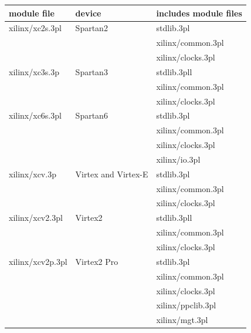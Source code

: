    \begin{tabular}{| l | l | l |}
    \hline
    module file      & device                          & includes module files  \\
    \hline \hline
    xilinx/xc2s.3pl  & Spartan2                        & stdlib.3pl \\
                     &                                 & xilinx/common.3pl \\
                     &                                 & xilinx/clocks.3pl \\ \hline
    xilinx/xc3s.3p   & Spartan3                        & stdlib.3pll \\
                     &                                 & xilinx/common.3pl \\
                     &                                 & xilinx/clocks.3pl \\ \hline
    xilinx/xc6s.3pl  & Spartan6                        & stdlib.3pl \\
                     &                                 & xilinx/common.3pl \\
                     &                                 & xilinx/clocks.3pl \\
                     &                                 & xilinx/io.3pl \\ \hline
    xilinx/xcv.3p    & Virtex and Virtex-E             & stdlib.3pl \\
                     &                                 & xilinx/common.3pl \\
                     &                                 & xilinx/clocks.3pl \\ \hline
    xilinx/xcv2.3pl  & Virtex2                         & stdlib.3pll \\
                     &                                 & xilinx/common.3pl \\
                     &                                 & xilinx/clocks.3pl \\ \hline
    xilinx/xcv2p.3pl & Virtex2 Pro                     & stdlib.3pl \\
                     &                                 & xilinx/common.3pl \\
                     &                                 & xilinx/clocks.3pl \\
                     &                                 & xilinx/ppclib.3pl \\
                     &                                 & xilinx/mgt.3pl \\ \hline

\end{tabular}
